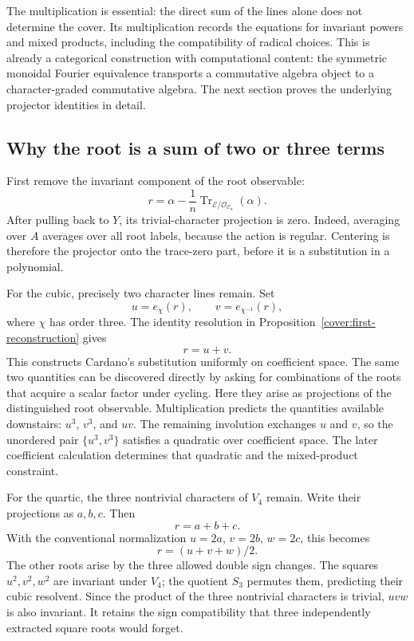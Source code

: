 \documentclass[11pt]{article}
\theoremstyle{remark}
\begin{document}
The multiplication is essential: the direct sum of the lines alone does not determine the cover. Its multiplication records the equations for invariant powers and mixed products, including the compatibility of radical choices. This is already a categorical construction with computational content: the symmetric monoidal Fourier equivalence transports a commutative algebra object to a character-graded commutative algebra. The next section proves the underlying projector identities in detail.

\subsection{Why the root is a sum of two or three terms}

First remove the invariant component of the root observable:
\[
r=\alpha-\frac1n\operatorname{Tr}_{\mathcal E/
\mathcal O_{\mathcal C_n}}(\alpha).
\]
After pulling back to \(Y\), its trivial-character projection is zero. Indeed, averaging over \(A\) averages over all root labels, because the action is regular. Centering is therefore the projector onto the trace-zero part, before it is a substitution in a polynomial.

For the cubic, precisely two character lines remain. Set
\[
u=e_\chi(r),\qquad v=e_{\chi^{-1}}(r),
\]
where \(\chi\) has order three. The identity resolution in
Proposition~\ref{cover:first-reconstruction} gives
\[
\boxed{r=u+v.}
\]
This constructs Cardano's substitution uniformly on coefficient space. The same two quantities can be discovered directly by asking for combinations of the roots that acquire a scalar factor under cycling. Here they arise as projections of the distinguished root observable. Multiplication predicts the quantities available downstairs: \(u^3\), \(v^3\), and \(uv\). The remaining involution exchanges \(u\) and \(v\), so the unordered pair \(\{u^3,v^3\}\) satisfies a quadratic over coefficient space. The later coefficient calculation determines that quadratic and the mixed-product constraint.

For the quartic, the three nontrivial characters of \(V_4\) remain. Write their projections as \(a,b,c\). Then
\[
r=a+b+c.
\]
With the conventional normalization \(u=2a\), \(v=2b\), \(w=2c\), this becomes
\[
\boxed{r=(u+v+w)/2.}
\]
The other roots arise by the three allowed double sign changes. The squares
\(u^2,v^2,w^2\) are invariant under \(V_4\); the quotient \(S_3\) permutes them, predicting their cubic resolvent. Since the product of the three nontrivial characters is trivial, \(uvw\) is also invariant. It retains the sign compatibility that three independently extracted square roots would forget.
\end{document}
